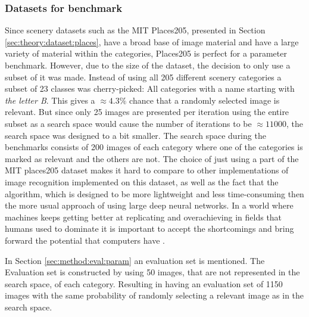 \subsubsection{Datasets for benchmark}
\label{sec:meth:eval:bench:dataset}

Since scenery datasets such as the MIT Places205, presented in Section \ref{sec:theory:dataset:places}, have a broad base of image material and have a large variety of material within the categories, Places205 is perfect for a parameter benchmark. However, due to the size of the dataset, the decision to only use a subset of it was made. Instead of using all 205 different scenery categories a subset of 23 classes was cherry-picked: All categories with a name starting with \emph{the letter B}. This gives a $\approx 4.3\%$ chance that a randomly selected image is relevant. But since only 25 images are presented per iteration using the entire subset as a search space would cause the number of iterations to be $\approx 11000$, the search space was designed to a bit smaller. The search space during the benchmarks consists of 200 images of each category where one of the categories is marked as relevant and the others are not. 
The choice of just using a part of the MIT places205 dataset makes it hard to compare to other implementations of image recognition implemented on this dataset, as well as the fact that the algorithm, which is designed to be more lightweight and less time-consuming then the more usual approach of using large deep neural networks. In a world where machines keeps getting better at replicating and overachieving in fields that humans used to dominate it is important to accept the shortcomings and bring forward the potential that computers have \cite{eetimes2015johnson}\cite{forbes2015thomsen}\cite{he2015delving}. 

In Section \ref{sec:method:eval:param} an evaluation set is mentioned. The Evaluation set is constructed by using 50 images, that are not represented in the search space, of each category. Resulting in having an evaluation set of 1150 images with the same probability of randomly selecting a relevant image as in the search space.  

